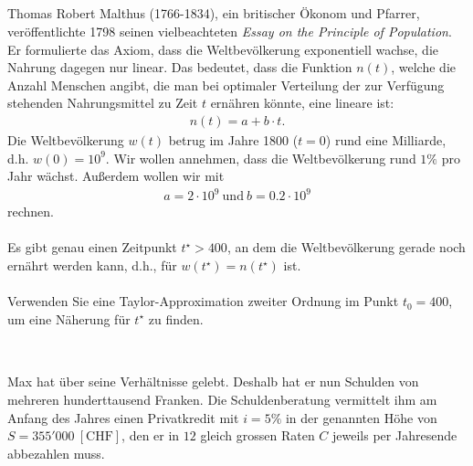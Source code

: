 \subsection*{}
Thomas Robert Malthus (1766-1834), ein britischer Ökonom und Pfarrer, veröffentlichte
1798 seinen vielbeachteten \textit{Essay on the Principle of Population}.
Er formulierte das Axiom, dass die Weltbevölkerung exponentiell wachse, die Nahrung dagegen nur linear. 
Das bedeutet, dass die Funktion $ n(t) $, welche die Anzahl Menschen angibt, die man bei optimaler Verteilung der zur Verfügung stehenden Nahrungsmittel zu Zeit $ t $ ernähren könnte, eine lineare ist:
\begin{align*}
	n(t) = a + b \cdot t.
\end{align*}
Die Weltbevölkerung $ w(t) $ betrug im Jahre 1800 ($ t= 0 $) rund eine Milliarde, d.h. $ w(0) = 10^9 $.
Wir wollen annehmen, dass die Weltbevölkerung rund $ 1\% $ pro Jahr wächst.
Außerdem wollen wir mit
\begin{align*}
	a = 2 \cdot 10^9 \ \textrm{und} \ b = 0.2 \cdot 10^9
\end{align*}
rechnen.\\
\\
Es gibt genau einen Zeitpunkt $ t^\star > 400 $, an dem die Weltbevölkerung gerade noch ernährt werden kann, d.h., für $ w(t^\star)  = n(t^\star )$ ist.\\
\\
Verwenden Sie eine Taylor-Approximation zweiter Ordnung im Punkt $ t_0 = 400 $, um eine Näherung für $ t^\star $ zu finden.
 \\
\\
\titleformat{\subsection}[display]
{\normalfont\large\bfseries}{\thesubsection}{1mm}{}
\subsection*{}
Max hat über seine Verhältnisse gelebt. 
Deshalb hat er nun Schulden von mehreren hunderttausend Franken.
Die Schuldenberatung vermittelt ihm am Anfang des Jahres einen Privatkredit mit $ i = 5 \% $ in der genannten Höhe von $ S = 355'000 \ [\textrm{CHF}] $, den er in $ 12 $ gleich grossen Raten $ C $ jeweils per Jahresende abbezahlen muss. 
\\ \\
